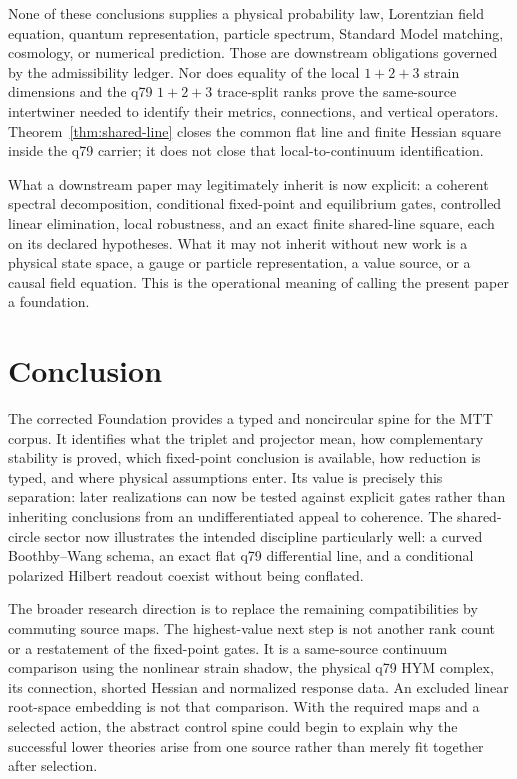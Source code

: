 \documentclass[11pt]{article}
\begin{document}
None of these conclusions supplies a physical probability law, Lorentzian
field equation, quantum representation, particle spectrum, Standard Model
matching, cosmology, or numerical prediction. Those are downstream
obligations governed by the admissibility ledger. Nor does equality of the
local $1+2+3$ strain dimensions and the q79 $1+2+3$ trace-split ranks prove the
same-source intertwiner needed to identify their metrics, connections, and
vertical operators. Theorem~\ref{thm:shared-line} closes the common flat line
and finite Hessian square inside the q79 carrier; it does not close that
local-to-continuum identification.

What a downstream paper may legitimately inherit is now explicit: a coherent
spectral decomposition, conditional fixed-point and equilibrium gates,
controlled linear elimination, local robustness, and an exact finite
shared-line square, each on its declared hypotheses. What it may not inherit
without new work is a physical state space, a gauge or particle
representation, a value source, or a causal field equation. This is the
operational meaning of calling the present paper a foundation.

\section{Conclusion}

The corrected Foundation provides a typed and noncircular spine for the MTT
corpus. It identifies what the triplet and projector mean, how complementary
stability is proved, which fixed-point conclusion is available, how reduction
is typed, and where physical assumptions enter. Its value is precisely this
separation: later realizations can now be tested against explicit gates rather
than inheriting conclusions from an undifferentiated appeal to coherence.
The shared-circle sector now illustrates the intended discipline particularly
well: a curved Boothby--Wang schema, an exact flat q79 differential line, and
a conditional polarized Hilbert readout coexist without being conflated.

The broader research direction is to replace the remaining compatibilities by
commuting source maps. The highest-value next step is not another rank count
or a restatement of the fixed-point gates. It is a same-source continuum
comparison using the nonlinear strain shadow, the physical q79 HYM complex,
its connection, shorted Hessian and normalized response data. An excluded
linear root-space embedding is not that comparison. With the required maps and a
selected action, the abstract control spine could begin to explain why the
successful lower theories arise from one source rather than merely fit
together after selection.
\end{document}
